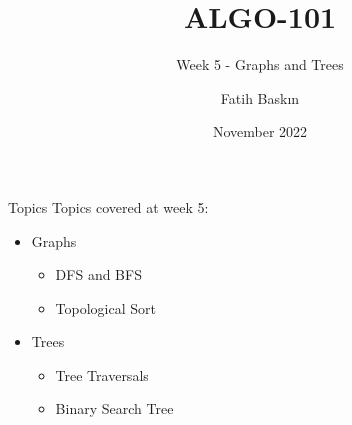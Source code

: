 \documentclass[aspectratio=169]{beamer}%
\title{ALGO-101}%
\subtitle{Week 5 - Graphs and Trees}%
\author{Fatih Baskın}%
\date{November 2022}%
\institute{ITU ACM}%
\begin{document}
%

\frame{\titlepage}%

\begin{frame}{Topics}
    Topics covered at week 5:
    \begin{itemize}%
        \item Graphs
            \begin{itemize}
                \item DFS and BFS
                \item Topological Sort
            \end{itemize}
        \item Trees
            \begin{itemize}%
                \item Tree Traversals
                \item Binary Search Tree
            \end{itemize}%
    \end{itemize}%
\end{frame}%
\end{document}
